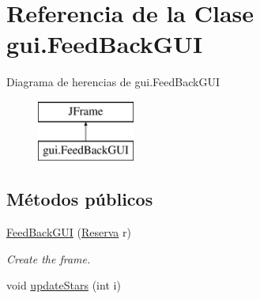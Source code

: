 \hypertarget{classgui_1_1_feed_back_g_u_i}{}\section{Referencia de la Clase gui.\+Feed\+Back\+G\+UI}
\label{classgui_1_1_feed_back_g_u_i}
Diagrama de herencias de gui.\+Feed\+Back\+G\+UI\begin{figure}[H]
\begin{center}
\leavevmode
\includegraphics[height=2.000000cm]{classgui_1_1_feed_back_g_u_i}
\end{center}
\end{figure}
\subsection*{Métodos públicos}
\begin{DoxyCompactItemize}
\item 
\mbox{\hyperlink{classgui_1_1_feed_back_g_u_i_a792ef572db37f3302efb1bf658ef2bd2}{Feed\+Back\+G\+UI}} (\mbox{\hyperlink{classdomain_1_1_reserva}{Reserva}} r)
\begin{DoxyCompactList}\small\item\em Create the frame. \end{DoxyCompactList}\item 
void \mbox{\hyperlink{classgui_1_1_feed_back_g_u_i_a70a8204a531b922364fdef575045e505}{update\+Stars}} (int i)
\end{DoxyCompactItemize}
